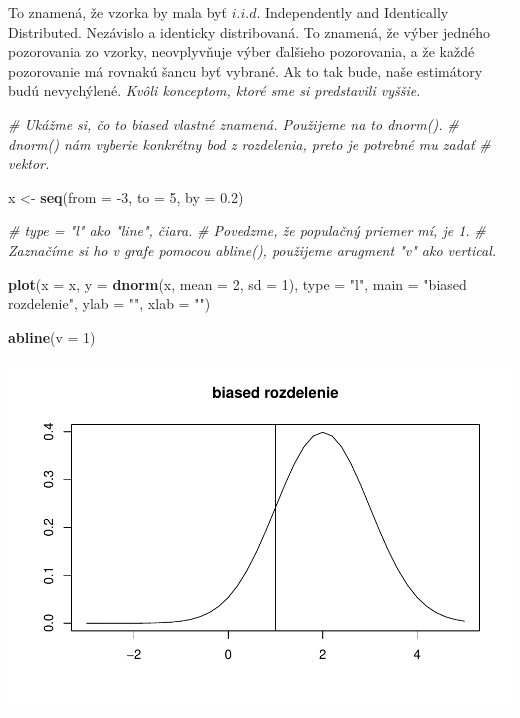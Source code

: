 \documentclass[]{article}
\newenvironment{Shaded}{\begin{snugshade}}{\end{snugshade}}
\newcommand{\CommentTok}[1]{\textcolor[rgb]{0.56,0.35,0.01}{\textit{#1}}}
\newcommand{\DataTypeTok}[1]{\textcolor[rgb]{0.13,0.29,0.53}{#1}}
\newcommand{\DecValTok}[1]{\textcolor[rgb]{0.00,0.00,0.81}{#1}}
\newcommand{\FloatTok}[1]{\textcolor[rgb]{0.00,0.00,0.81}{#1}}
\newcommand{\KeywordTok}[1]{\textcolor[rgb]{0.13,0.29,0.53}{\textbf{#1}}}
\newcommand{\NormalTok}[1]{#1}
\newcommand{\StringTok}[1]{\textcolor[rgb]{0.31,0.60,0.02}{#1}}
\begin{document}
To znamená, že vzorka by mala byť \(i.i.d\). Independently and
Identically Distributed. Nezávislo a identicky distribovaná. To znamená,
že výber jedného pozorovania zo vzorky, neovplyvňuje výber ďalšieho
pozorovania, a že každé pozorovanie má rovnakú šancu byť vybrané. Ak to
tak bude, naše estimátory budú nevychýlené. \emph{Kvôli konceptom, ktoré
sme si predstavili vyššie.}

\begin{Shaded}
\begin{Highlighting}[]
\CommentTok{# Ukážme si, čo to biased vlastné znamená. Použijeme na to dnorm().}
\CommentTok{# dnorm() nám vyberie konkrétny bod z rozdelenia, preto je potrebné mu zadať}
\CommentTok{# vektor.}

\NormalTok{x <-}\StringTok{ }\KeywordTok{seq}\NormalTok{(}\DataTypeTok{from =} \DecValTok{-3}\NormalTok{, }\DataTypeTok{to =} \DecValTok{5}\NormalTok{, }\DataTypeTok{by =} \FloatTok{0.2}\NormalTok{)}

\CommentTok{# type = "l" ako "line", čiara.}
\CommentTok{# Povedzme, že populačný priemer mí, je 1.}
\CommentTok{# Zaznačíme si ho v grafe pomocou abline(), použijeme arugment "v" ako vertical.}


\KeywordTok{plot}\NormalTok{(}\DataTypeTok{x =}\NormalTok{ x, }\DataTypeTok{y =} \KeywordTok{dnorm}\NormalTok{(x, }\DataTypeTok{mean =} \DecValTok{2}\NormalTok{, }\DataTypeTok{sd =} \DecValTok{1}\NormalTok{), }\DataTypeTok{type =} \StringTok{"l"}\NormalTok{,}
     \DataTypeTok{main =} \StringTok{"biased rozdelenie"}\NormalTok{, }\DataTypeTok{ylab =} \StringTok{""}\NormalTok{, }\DataTypeTok{xlab =} \StringTok{""}\NormalTok{)}

\KeywordTok{abline}\NormalTok{(}\DataTypeTok{v =} \DecValTok{1}\NormalTok{)}
\end{Highlighting}
\end{Shaded}

\includegraphics{test_files/figure-latex/unnamed-chunk-45-1.pdf}
\end{document}
